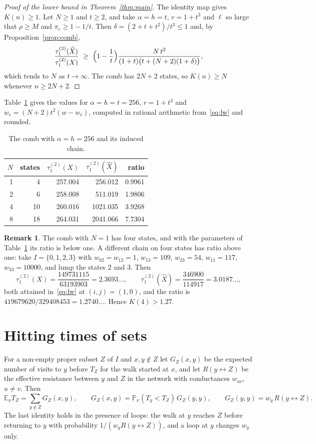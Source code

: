 \documentclass[11pt]{amsart}
\theoremstyle{definition}
\newtheorem{remark}[theorem]{Remark}
\newcommand{\Prob}{\mathbb{P}}
\newcommand{\E}{\mathbb{E}}
\newcommand{\tmix}{\tau_1^{(2)}}
\newcommand{\hX}{\widehat{X}}
\newcommand{\lra}{\leftrightarrow}
\begin{document}
\begin{proof}[Proof of the lower bound in Theorem~\ref{thm:main}]
The identity map gives $K(n)\ge1$. Let $N\ge1$ and $t\ge2$, and take $\alpha=h=t$, $r=1+t^3$ and $\ell$ so large
that $\rho\ge M$ and $\pi_c\ge1-1/t$. Then $\delta=(2+t+t^2)/t^3\le1$ and, by Proposition~\ref{prop:comb},
\[
\frac{\tmix(\hX)}{\tmix(X)}\ \ge\ \Bigl(1-\frac1t\Bigr)\frac{N\,t^2}{(1+t)\bigl(t+(N+2)(1+\delta)\bigr)},
\]
which tends to $N$ as $t\to\infty$. The comb has $2N+2$ states, so $K(n)\ge N$ whenever $n\ge2N+2$.
\end{proof}

Table~\ref{tab:comb} gives the values for $\alpha=h=t=256$, $r=1+t^3$ and $w_c=(N+2)t^2(w-w_c)$, computed in
rational arithmetic from~\eqref{eq:lw} and rounded.

\begin{table}[h]
\centering
\begin{tabular}{rrrrr}
\toprule
$N$ & states & $\tmix(X)$ & $\tmix(\hX)$ & ratio\\
\midrule
1 & 4 & 257.004 & 256.012 & 0.9961\\
2 & 6 & 258.008 & 511.019 & 1.9806\\
4 & 10 & 260.016 & 1021.035 & 3.9268\\
8 & 18 & 264.031 & 2041.066 & 7.7304\\
\bottomrule
\end{tabular}
\caption{The comb with $\alpha=h=256$ and its induced chain.}\label{tab:comb}
\end{table}

\begin{remark}\label{rem:four}
The comb with $N=1$ has four states, and with the parameters of Table~\ref{tab:comb} its ratio is below one. A
different chain on four states has ratio above
one: take $I=\{0,1,2,3\}$ with $w_{02}=w_{12}=1$, $w_{13}=109$, $w_{23}=54$, $w_{11}=117$, $w_{33}=10000$, and lump
the states $2$ and $3$. Then
\[
\tmix(X)=\frac{149731115}{63193903}=2.3693\ldots,\qquad \tmix(\hX)=\frac{346900}{114917}=3.0187\ldots,
\]
both attained in~\eqref{eq:lw} at $(i,j)=(1,0)$, and the ratio is $419679620/329408453=1.2740\ldots$. Hence
$K(4)>1.27$.
\end{remark}

\section{Hitting times of sets}\label{sec:hit}
For a non-empty proper subset $Z$ of $I$ and $x,y\notin Z$ let $G_Z(x,y)$ be the expected number of visits to $y$ before $T_Z$
for the walk started at $x$, and let $R(y\lra Z)$ be the effective resistance between $y$ and $Z$ in the network with
conductances $w_{uv}$, $u\ne v$. Then~\cite[Section~2.2]{LP}
\begin{equation}\label{eq:green}
\E_xT_Z=\sum_{y\notin Z}G_Z(x,y),\qquad G_Z(x,y)=\Prob_x(T_y<T_Z)\,G_Z(y,y),\qquad G_Z(y,y)=w_y\,R(y\lra Z).
\end{equation}
The last identity holds in the presence of loops: the walk at $y$ reaches $Z$ before returning to $y$ with
probability $1/(w_yR(y\lra Z))$, and a loop at $y$ changes $w_y$ only.
\end{document}
